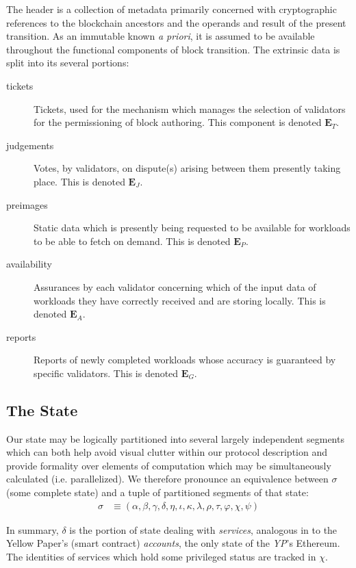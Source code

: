 The header is a collection of metadata primarily concerned with cryptographic references to the blockchain ancestors and the operands and result of the present transition. As an immutable known \emph{a priori}, it is assumed to be available throughout the functional components of block transition. The extrinsic data is split into its several portions:

\begin{description}
  \item[tickets] Tickets, used for the mechanism which manages the selection of validators for the permissioning of block authoring. This component is denoted $\mathbf{E}_T$.
  \item[judgements] Votes, by validators, on dispute(s) arising between them presently taking place. This is denoted $\mathbf{E}_J$.
  \item[preimages] Static data which is presently being requested to be available for workloads to be able to fetch on demand. This is denoted $\mathbf{E}_P$.
  \item[availability] Assurances by each validator concerning which of the input data of workloads they have correctly received and are storing locally. This is denoted $\mathbf{E}_A$.
  \item[reports] Reports of newly completed workloads whose accuracy is guaranteed by specific validators. This is denoted $\mathbf{E}_G$.
\end{description}

\subsection{The State}

Our state may be logically partitioned into several largely independent segments which can both help avoid visual clutter within our protocol description and provide formality over elements of computation which may be simultaneously calculated (i.e. parallelized). We therefore pronounce an equivalence between $\sigma$ (some complete state) and a tuple of partitioned segments of that state:
\begin{align}\label{eq:statecomposition}
  \sigma &\equiv (\alpha, \beta, \gamma, \delta, \eta, \iota, \kappa, \lambda, \rho, \tau, \varphi, \chi, \psi)
\end{align}

In summary, $\delta$ is the portion of state dealing with \emph{services}, analogous in \Jam to the Yellow Paper's (smart contract) \emph{accounts}, the only state of the \emph{YP}'s Ethereum. The identities of services which hold some privileged status are tracked in $\chi$.

